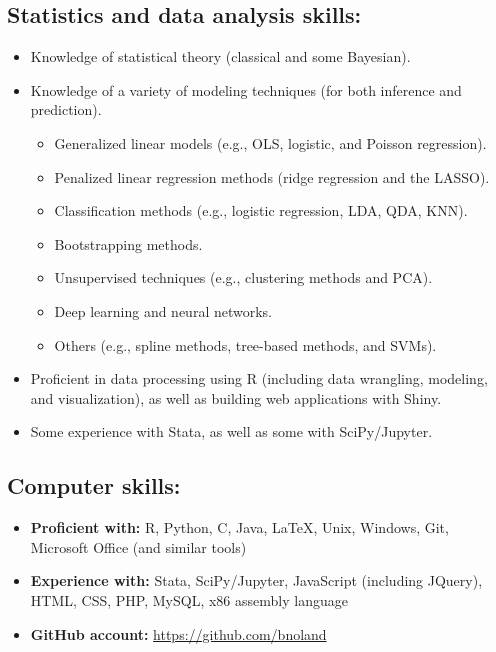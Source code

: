 \documentclass[letterpaper,12pt]{article}
\begin{document}
\subsection*{Statistics and data analysis skills:}
\begin{itemize}
\item
Knowledge of statistical theory (classical and some Bayesian).
\item
Knowledge of a variety of modeling techniques (for both inference and prediction).
\begin{itemize}
\item
Generalized linear models (e.g., OLS, logistic, and Poisson regression).
\item
Penalized linear regression methods (ridge regression and the LASSO).
\item
Classification methods (e.g., logistic regression, LDA, QDA, KNN).
\item
Bootstrapping methods.
\item
Unsupervised techniques (e.g., clustering methods and PCA).
\item
Deep learning and neural networks.
\item
Others (e.g., spline methods, tree-based methods, and SVMs).
\end{itemize}
\item
Proficient in data processing using R (including data wrangling, modeling, and visualization), as 
well as building web applications with Shiny.
\item
Some experience with Stata, as well as some with SciPy/Jupyter.
\end{itemize}

\subsection*{Computer skills:}
\begin{itemize}
\item
\textbf{Proficient with:} R, Python, C, Java, \LaTeX, Unix, Windows, Git, Microsoft Office (and 
similar tools)
\item
\textbf{Experience with:} Stata, SciPy/Jupyter, JavaScript (including JQuery), HTML, CSS, PHP, 
MySQL, x86 assembly language
\item
\textbf{GitHub account:} \url{https://github.com/bnoland}
\end{itemize}
\end{document}
